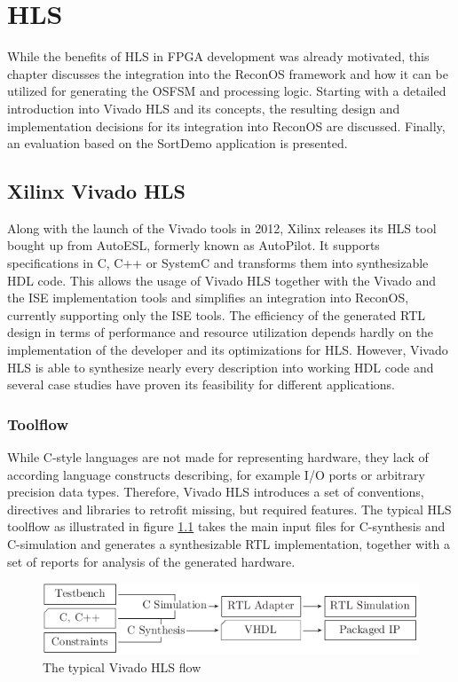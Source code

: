\chapter{\acl{HLS}}
\label{chap:hls}
While the benefits of \ac{HLS} in \ac{FPGA} development was already motivated,
this chapter discusses the integration into the ReconOS framework and how it
can be utilized for generating the \ac{OSFSM} and processing logic. Starting
with a detailed introduction into Vivado HLS and its concepts, the resulting
design and implementation decisions for its integration into ReconOS are
discussed. Finally, an evaluation based on the SortDemo application is
presented.

\section{Xilinx Vivado HLS}
Along with the launch of the Vivado tools in 2012, Xilinx releases its
\ac{HLS} tool bought up from AutoESL, formerly known as AutoPilot. It supports
specifications in C, C++ or SystemC and transforms them into synthesizable
\ac{HDL} code. This allows the usage of Vivado \ac{HLS} together with the
Vivado and the ISE implementation tools and simplifies an integration into
ReconOS, currently supporting only the ISE tools. The efficiency of the
generated RTL design in terms of performance and resource utilization depends
hardly on the implementation of the developer and its optimizations for
\ac{HLS}. However, Vivado HLS is able to synthesize nearly every description
into working \ac{HDL} code and several case studies \citep{SWL13,OCC14} have
proven its feasibility for different applications.

\subsection{Toolflow}
While C-style languages are not made for representing hardware, they lack of
according language constructs describing, for example I/O ports or arbitrary
precision data types. Therefore, Vivado HLS introduces a set of conventions,
directives and libraries to retrofit missing, but required features. The
typical \ac{HLS} toolflow as illustrated in figure \ref{fig:hls_flow} takes
the main input files for C-synthesis and C-simulation and generates a
synthesizable \ac{RTL} implementation, together with a set of reports for
analysis of the generated hardware.
\begin{figure}[tb]
	\centering
	\includegraphics{../figures/hls_flow}
	\caption{The typical Vivado HLS flow \citep[adapted from][]{ug902}}
	\label{fig:hls_flow}
\end{figure}


